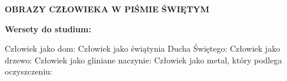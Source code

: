 \documentclass[10pt,a4paper,oneside]{article}
\begin{document}
\centerline{\textbf{\MakeUppercase{Obrazy człowieka w Piśmie Świętym}}}
\begin{center}
\textbf{Wersety do studium:} 
\end{center}
Człowiek jako dom:
Człowiek jako świątynia Ducha Świętego:
Człowiek jako drzewo:
Człowiek jako gliniane naczynie:
Człowiek jako metal, który podlega oczyszczeniu:
\end{document}
